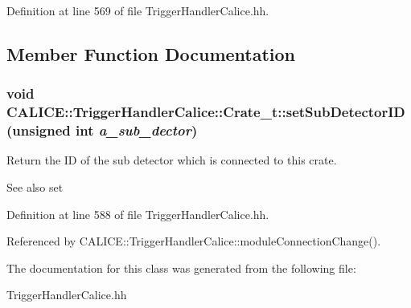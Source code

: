 Definition at line 569 of file TriggerHandlerCalice.hh.

\subsection{Member Function Documentation}
\subsubsection[{setSubDetectorID}]{\setlength{\rightskip}{0pt plus 5cm}void CALICE::TriggerHandlerCalice::Crate\_\-t::setSubDetectorID (unsigned int {\em a\_\-sub\_\-dector})\hspace{0.3cm}{\ttfamily  [inline]}}\label{classCALICE_1_1TriggerHandlerCalice_1_1Crate__t_a4ad877cf64ba3e78b93d86d21834f281}


Return the ID of the sub detector which is connected to this crate. \begin{DoxySeeAlso}{See also}
set 
\end{DoxySeeAlso}


Definition at line 588 of file TriggerHandlerCalice.hh.

Referenced by CALICE::TriggerHandlerCalice::moduleConnectionChange().

The documentation for this class was generated from the following file:\begin{DoxyCompactItemize}
\item 
TriggerHandlerCalice.hh\end{DoxyCompactItemize}
